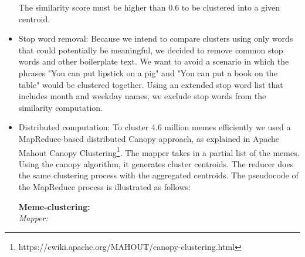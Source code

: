 \documentclass{sig-alternate}
\begin{document}
\begin{itemize}
The similarity score must be higher than 0.6 to be clustered into a given centroid.
 
 \item Stop word removal: Because we intend to compare clusters using only words that could potentially be meaningful, we decided to remove common stop words and other boilerplate text. We want to avoid a scenario in which the phrases "You can put lipstick on a pig" and "You can put a book on the table" would be clustered together. Using an extended stop word list that includes month and weekday names, we exclude stop words from the similarity computation. 
 \item Distributed computation: To cluster 4.6 million memes efficiently we used a MapReduce-based distributed Canopy approach, as explained in Apache Mahout Canopy Clustering\footnote{https://cwiki.apache.org/MAHOUT/canopy-clustering.html}. The mapper takes in a partial list of the memes. Using the canopy algorithm, it generates cluster centroids. The reducer does the same clustering process with the aggregated centroids. The pseudocode of the MapReduce process is illustrated as follows:
 

\begin{centering}
\begin{tabbing}
\textbf{Meme-clustering:}\\
\emph{Mapper:}\\


\end{tabbing}
\end{centering}
\end{itemize}
\end{document}
